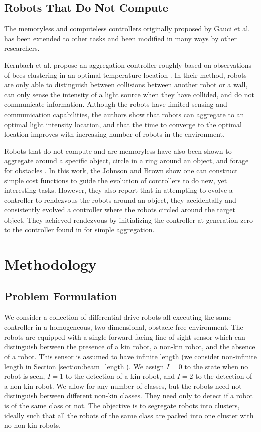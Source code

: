 \documentclass[conference]{IEEEtran}
\begin{document}
  \subsection{Robots That Do Not Compute}

    The memoryless and computeless controllers originally proposed by Gauci et al. has been extended to other tasks and been modified in many ways by other researchers.

    Kernbach et al. propose an aggregation controller roughly based on observations of bees clustering in an optimal temperature location \cite{kernbach_re-embodiment_2009}. In their method, robots are only able to distinguish between collisions between another robot or a wall, can only sense the intensity of a light source when they have collided, and do not communicate information. Although the robots have limited sensing and communication capabilities, the authors show that robots can aggregate to an optimal light intensity location, and that the time to converge to the optimal location improves with increasing number of robots in the environment.

    Robots that do not compute and are memoryless have also been shown to aggregate around a specific object, circle in a ring around an object, and forage for obstacles \cite{johnson_evolving_2016}. In this work, the Johnson and Brown show one can construct simple cost functions to guide the evolution of controllers to do new, yet interesting tasks. However, they also report that in attempting to evolve a controller to rendezvous the robots around an object, they accidentally and consistently evolved a controller where the robots circled around the target object. They achieved rendezvous by initializing the controller at generation zero to the controller found in \cite{gauci_self-organized_2014} for simple aggregation.

\section{Methodology}

  \subsection{Problem Formulation}

    We consider a collection of differential drive robots all executing the same controller in a homogeneous, two dimensional, obstacle free environment. The robots are equipped with a single forward facing line of sight sensor which can distinguish between the presence of a kin robot, a non-kin robot, and the absence of a robot. This sensor is assumed to have infinite length (we consider non-infinite length in Section \ref{section:beam_length}). We assign $I=0$ to the state when no robot is seen, $I=1$ to the detection of a kin robot, and $I=2$ to the detection of a non-kin robot. We allow for any number of classes, but the robots need not distinguish between different non-kin classes. They need only to detect if a robot is of the same class or not. The objective is to segregate robots into clusters, ideally such that all the robots of the same class are packed into one cluster with no non-kin robots.
\end{document}
